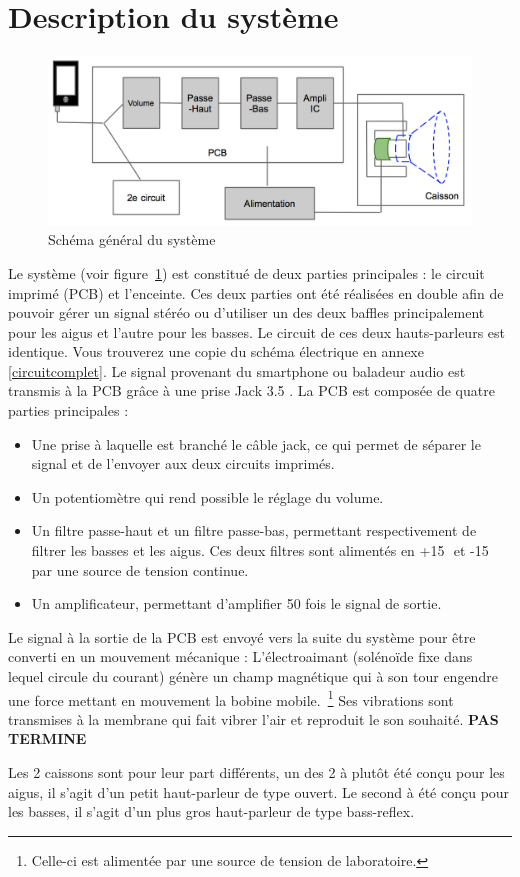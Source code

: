 \section{Description du système}

\begin{figure}[h]
\begin{center}
\includegraphics[width=\textwidth]{img/schemacomplet} 
\end{center}
\caption{Schéma général du système}		
\label{fig:schemacomplet}		
\end{figure}

Le système (voir figure~\ref{fig:schemacomplet}) est constitué de deux parties principales : le circuit imprimé (PCB) et l'enceinte. 
Ces deux parties ont été réalisées en double afin de pouvoir gérer un signal stéréo ou d'utiliser un des deux baffles principalement pour les aigus et l'autre pour les basses. Le circuit de ces deux hauts-parleurs est identique. Vous trouverez une copie du schéma électrique en annexe \ref{circuitcomplet}.
Le signal provenant du smartphone ou baladeur audio est transmis à la PCB grâce à une prise Jack 3.5 \milli\meter.
La PCB est composée de quatre parties principales :
\begin{itemize}
\item Une prise à laquelle est branché le câble jack, ce qui permet de séparer le signal et de l'envoyer aux deux circuits imprimés.
\item Un potentiomètre qui rend possible le réglage du volume.
\item Un filtre passe-haut et un filtre passe-bas, permettant respectivement de filtrer les basses et les aigus. Ces deux filtres sont alimentés en +15\,\volt \, et -15\,\volt \, par une source de tension continue.
\item Un amplificateur, permettant d'amplifier 50 fois le signal de sortie.
\end{itemize}
Le signal à la sortie de la PCB est envoyé vers la suite du système pour être converti en un mouvement mécanique : 
L'électroaimant (solénoïde fixe dans lequel circule du courant) génère un champ magnétique qui à son tour engendre une force mettant en mouvement la bobine mobile.~\footnote{Celle-ci est alimentée par une source de tension de laboratoire.}
Ses vibrations sont transmises à la membrane qui fait vibrer l'air et reproduit le son souhaité.
\textbf{PAS TERMINE}

Les 2 caissons sont pour leur part différents, un des 2 à plutôt été conçu pour les aigus, il s'agit d'un petit haut-parleur de type ouvert. Le second à été conçu pour les basses, il s'agit d'un plus gros haut-parleur de type bass-reflex.





